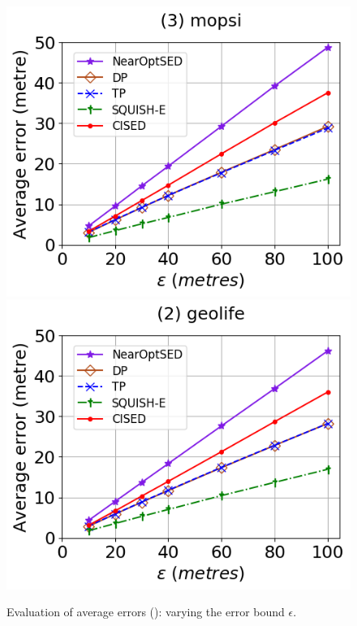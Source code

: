 \begin{figure}[tb!]
	\includegraphics[scale=0.315]{Figures/Exp-SED-error-epsilon-mopsi.png}		\hspace{1ex}
	\includegraphics[scale=0.315]{Figures/Exp-SED-error-epsilon-geolife.png}
	\vspace{-2.5ex}
	\caption{\small Evaluation of average errors (\sed): varying the error bound $\epsilon$.}
	\label{fig:ae-sed}
	\vspace{-3ex}
\end{figure}

\vspace{-1ex}
